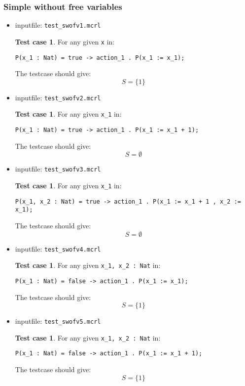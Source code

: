 \index{}\documentclass[a4paper,10pt]{article}
\theoremstyle{plain}
\theoremstyle{definition}
\newtheorem{tcase}[thmfs]{Test case}
\begin{document}
\subsubsection{Simple without free variables}
\begin{itemize}

\item inputfile: \verb"test_swofv1.mcrl" 
\begin{tcase}
For any given \verb"x" in:
\begin{verbatim}
P(x_1 : Nat) = true -> action_1 . P(x_1 := x_1);
\end{verbatim}
The testcase should give:
$$ S = \lbrace 1 \rbrace $$
\end{tcase}

\item inputfile: \verb"test_swofv2.mcrl" 
\begin{tcase} 
For any given \verb"x_1" in:
\begin{verbatim}
P(x_1 : Nat) = true -> action_1 . P(x_1 := x_1 + 1);
\end{verbatim}
The testcase should give:
$$ S = \emptyset $$
\end{tcase}

\item inputfile: \verb"test_swofv3.mcrl" 
\begin{tcase}
For any given \verb"x_1" in:
\begin{verbatim}
P(x_1, x_2 : Nat) = true -> action_1 . P(x_1 := x_1 + 1 , x_2 := x_1);
\end{verbatim}
The testcase should give:
$$ S = \emptyset $$
\end{tcase}

\item inputfile: \verb"test_swofv4.mcrl" 
\begin{tcase}
For any given \verb"x_1, x_2 : Nat" in:
\begin{verbatim}
P(x_1 : Nat) = false -> action_1 . P(x_1 := x_1);
\end{verbatim}
The testcase should give:
$$ S = \lbrace 1 \rbrace $$
\end{tcase}

\item inputfile: \verb"test_swofv5.mcrl" 
\begin{tcase}
For any given \verb"x_1, x_2 : Nat" in:
\begin{verbatim}
P(x_1 : Nat) = false -> action_1 . P(x_1 := x_1 + 1);
\end{verbatim}
The testcase should give:
$$ S = \lbrace 1 \rbrace  $$
\end{tcase}


\end{itemize}
\end{document}
